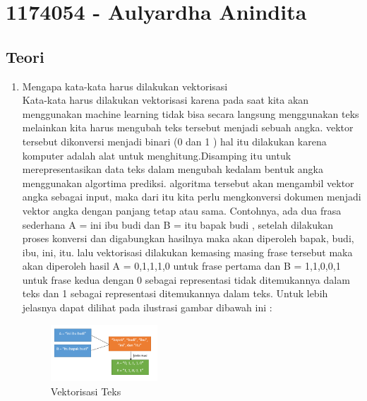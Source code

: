 \section{1174054 - Aulyardha Anindita}

\subsection{Teori}
\begin{enumerate}
\item Mengapa kata-kata harus dilakukan vektorisasi\\
Kata-kata harus dilakukan vektorisasi karena pada saat kita akan menggunakan machine learning tidak bisa secara langsung menggunakan teks melainkan kita harus mengubah teks tersebut menjadi sebuah angka. vektor tersebut dikonversi menjadi binari (0 dan 1 ) hal itu dilakukan karena komputer adalah alat untuk menghitung.Disamping itu untuk merepresentasikan data teks dalam mengubah kedalam bentuk angka menggunakan algortima prediksi. algoritma tersebut akan mengambil vektor angka sebagai input, maka dari itu kita perlu mengkonversi dokumen menjadi vektor angka dengan panjang tetap atau sama.
Contohnya, ada dua frasa sederhana A = ini ibu budi dan B = itu bapak budi , setelah dilakukan proses konversi dan digabungkan hasilnya maka akan diperoleh bapak, budi, ibu, ini, itu. lalu vektorisasi dilakukan kemasing masing frase tersebut maka akan diperoleh hasil A = 0,1,1,1,0 untuk frase pertama dan B = 1,1,0,0,1 untuk frase kedua dengan 0 sebagai representasi tidak ditemukannya dalam teks dan 1 sebagai representasi ditemukannya dalam teks. Untuk lebih jelasnya dapat dilihat pada ilustrasi gambar dibawah ini :
\hfill\break
	\begin{figure}[H]
		\includegraphics[width=4cm]{figures/1174054/5/1.png}
		\centering
		\caption{Vektorisasi Teks}
	\end{figure}


\end{enumerate}
